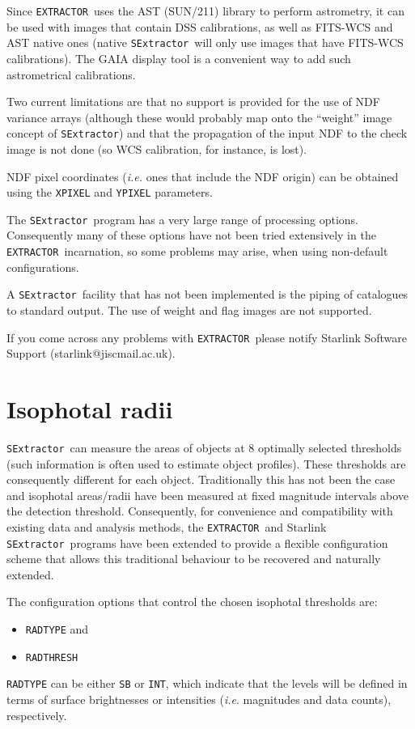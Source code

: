 \documentclass[twoside,11pt]{article}
\newcommand{\htmladdnormallink}[2]{#1}
\newcommand{\xref}[3]{#1}
\renewcommand{\_}{\texttt{\symbol{95}}}
\newcommand{\EXTRACTOR}{\texttt{EXTRACTOR}}
\newcommand{\SExtractor}{\texttt{SExtractor}}
\begin{document}
Since \EXTRACTOR\ uses the AST (\xref{SUN/211}{sun211}{}) library to
perform astrometry, it can be used with images that contain DSS
calibrations, as well as FITS-WCS and AST native ones (native
\SExtractor\ will only use images that have FITS-WCS
calibrations). The GAIA display tool is a convenient way to add such
astrometrical calibrations.

Two current limitations are that no support is provided for the use of
NDF variance arrays (although these would probably map onto the
``weight'' image concept of \SExtractor) and that the propagation of
the input NDF to the check image is not done (so WCS calibration, for
instance, is lost).

NDF pixel coordinates (\textit{i.e.} ones that include the NDF origin)
can be obtained using the \texttt{X\_PIXEL} and \texttt{Y\_PIXEL}
parameters.

The \SExtractor\ program has a very large range of processing
options. Consequently many of these options have not been tried
extensively in the \EXTRACTOR\ incarnation, so some problems may
arise, when using non-default configurations.

A \SExtractor\ facility that has not been implemented is the piping of
catalogues to standard output.  The use of weight and flag images are
not supported.

If you come across any problems with \EXTRACTOR\ please notify
Starlink Software Support
(\htmladdnormallink{starlink@jiscmail.ac.uk}{mailto:starlink@jiscmail.ac.uk}).

\section{Isophotal radii}

\SExtractor\ can measure the areas of objects at $8$ optimally selected
thresholds (such information is often used to estimate object
profiles). These thresholds are consequently different for each
object. Traditionally this has not been the case and isophotal
areas/radii have been measured at fixed magnitude intervals above the
detection threshold. Consequently, for convenience and compatibility
with existing data and analysis methods, the \EXTRACTOR\ and Starlink
\SExtractor\ programs have been extended to provide a flexible
configuration scheme that allows this traditional behaviour to be
recovered and naturally extended.

The configuration options that control the chosen isophotal thresholds
are:
\begin{itemize}
  \item \texttt{RAD\_TYPE} and
  \item \texttt{RAD\_THRESH}
\end{itemize}
\texttt{RAD\_TYPE} can be either \texttt{SB} or \texttt{INT},
which indicate that the levels will be defined in terms of surface
brightnesses or intensities (\textit{i.e}. magnitudes and data counts),
respectively.
\end{document}
